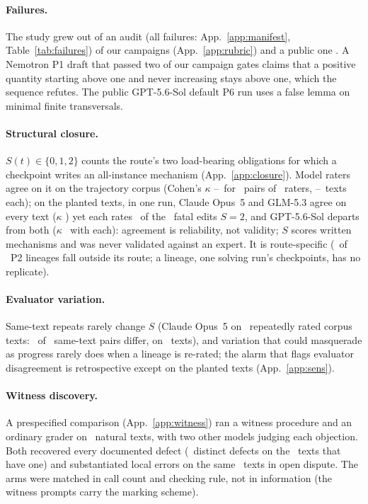 \documentclass{article}
\begin{document}
\paragraph{Failures.} The study grew out of an audit (all failures: App.~\ref{app:manifest}, Table~\ref{tab:failures}) of our campaigns (App.~\ref{app:rubric}) and a public one \citep{deedy2026imo}. A Nemotron P1 draft that passed two of our campaign gates claims that a positive quantity starting above one and never increasing stays above one, which the sequence  refutes. The public GPT-5.6-Sol default P6 run uses a false lemma on minimal finite transversals.

\paragraph{Structural closure.} $S(t)\in\{0,1,2\}$ counts the route's two load-bearing obligations for which a checkpoint writes an all-instance mechanism (App.~\ref{app:closure}). Model raters agree on it on the trajectory corpus (Cohen's $\kappa$ \CRKappaLo--\CRKappaHi\ for \CRKappaNPairs\ pairs of \CRKappaNRaters\ raters, \CRKappaNMin--\CRKappaNMax\ texts each); on the planted texts, in one run, Claude Opus~5 and GLM-5.3 agree on every text ($\kappa$ \CRClosureKappaCGLMP) yet each rates \CRClosureClaudeFAccP\ of the \CRNPerClass\ fatal edits $S{=}2$, and GPT-5.6-Sol departs from both ($\kappa$ \CRClosureKappaGCP\ with each): agreement is reliability, not validity; $S$ scores written mechanisms and was never validated against an expert. It is route-specific (\ROUTENA\ of \CRBodyPTwoLineages\ P2 lineages fall outside its route; a lineage, one solving run's checkpoints, has no replicate).

\paragraph{Evaluator variation.} Same-text repeats rarely change $S$ (Claude Opus~5 on \CRBodyRepeatTexts\ repeatedly rated corpus texts: \CRBodyRepeatDiffer\ of \CRBodyRepeatPairs\ same-text pairs differ, on \CRBodyRepeatVarTexts\ texts), and variation that could masquerade as progress rarely does when a lineage is re-rated; the alarm that flags evaluator disagreement is retrospective except on the planted texts (App.~\ref{app:sens}).

\paragraph{Witness discovery.} A prespecified comparison (App.~\ref{app:witness}) ran a witness procedure and an ordinary grader on \WITNESSN\ natural texts, with two other models judging each objection. Both recovered every documented defect (\CRWitnessDistinctDefects\ distinct defects on the \CRWitnessKnownTexts\ texts that have one) and substantiated local errors on the same \WITNESSSUBCD\ texts in open dispute. The arms were matched in call count and checking rule, not in information (the witness prompts carry the marking scheme).
\end{document}
